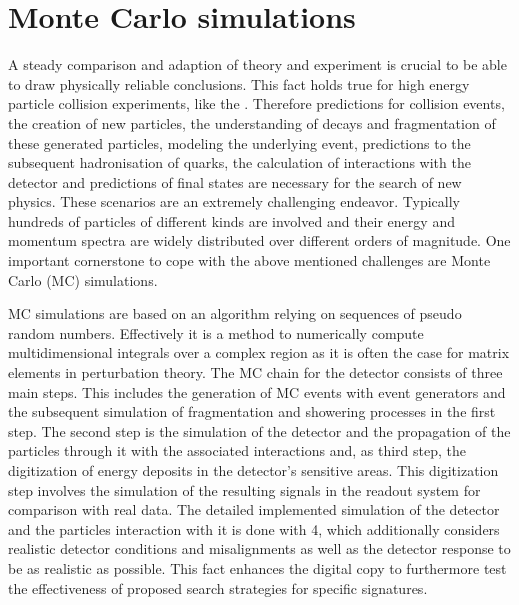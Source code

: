 \section{Monte Carlo simulations}\label{MCsim}
A steady comparison and adaption of theory and experiment is crucial to be able to draw physically reliable conclusions. This fact holds true for high energy particle collision experiments, like the {\LHC}. Therefore predictions for collision events, the creation of new particles, the understanding of decays and fragmentation of these generated particles, modeling the underlying event, predictions to the subsequent hadronisation of quarks, the calculation of interactions with the detector and predictions of final states are necessary for the search of new physics. These scenarios are an extremely challenging endeavor. Typically hundreds of particles of different kinds are involved and their energy and momentum spectra are widely distributed over different orders of magnitude. One important cornerstone to cope with the above mentioned challenges are Monte Carlo (MC) simulations. \cite{bigMC}\par
MC simulations are based on an algorithm relying on sequences of pseudo random numbers. Effectively it is a method to numerically compute multidimensional integrals over a complex region as it is often the case for matrix elements in perturbation theory. \cite{MCbook} The MC chain for the {\ATLAS} detector consists of three main steps. This includes the generation of MC events with event generators and the subsequent simulation of fragmentation and showering processes in the first step. The second step is the simulation of the detector and the propagation of the particles through it with the associated interactions and, as third step, the digitization of energy deposits in the detector's sensitive areas. This digitization step involves the simulation of the resulting signals in the readout system for comparison with real data. The detailed implemented simulation of the detector and the particles interaction with it is done with {\GEANT}4\cite{GEANT4}, which additionally considers realistic detector conditions and misalignments as well as the detector response to be as realistic as possible. This fact enhances the digital copy to furthermore test the effectiveness of proposed search strategies for specific signatures. \cite{ATLASSim}
